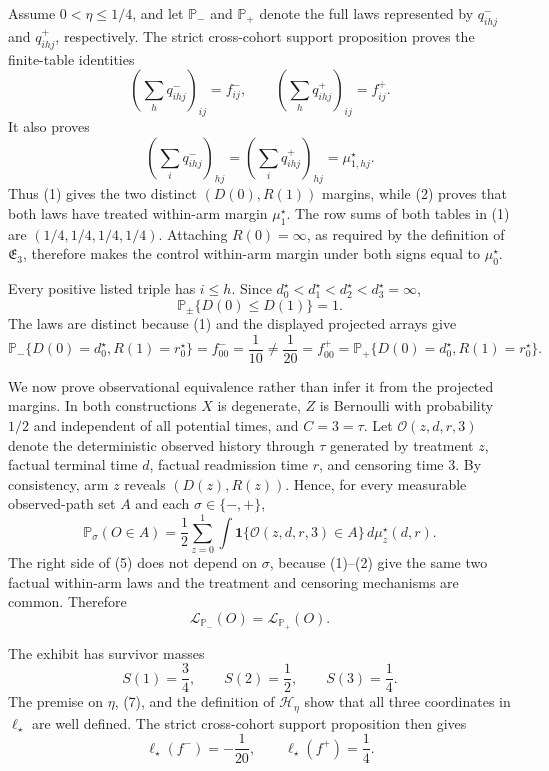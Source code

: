 Assume \(0<\eta\leq1/4\), and let \(\mathbb P_-\) and \(\mathbb P_+\) denote the full laws represented by \(q^-_{ihj}\) and \(q^+_{ihj}\), respectively.  The strict cross-cohort support proposition proves the finite-table identities
\[
 \left(\sum_hq^-_{ihj}\right)_{ij}=f^-_{ij},\qquad
 \left(\sum_hq^+_{ihj}\right)_{ij}=f^+_{ij}. \tag{1}
\]
It also proves
\[
 \left(\sum_iq^-_{ihj}\right)_{hj}
 =\left(\sum_iq^+_{ihj}\right)_{hj}
 =\mu_{1,hj}^\star. \tag{2}
\]
Thus (1) gives the two distinct \((D(0),R(1))\) margins, while (2) proves that both laws have treated within-arm margin \(\mu_1^\star\).  The row sums of both tables in (1) are \((1/4,1/4,1/4,1/4)\).  Attaching \(R(0)=\infty\), as required by the definition of \(\mathfrak E_3\), therefore makes the control within-arm margin under both signs equal to \(\mu_0^\star\).

Every positive listed triple has \(i\leq h\).  Since \(d_0^\star<d_1^\star<d_2^\star<d_3^\star=\infty\),
\[
 \mathbb P_\pm\{D(0)\leq D(1)\}=1. \tag{3}
\]
The laws are distinct because (1) and the displayed projected arrays give
\[
 \mathbb P_-\{D(0)=d_0^\star,R(1)=r_0^\star\}
 =f^-_{00}=\frac1{10}
 \neq\frac1{20}=f^+_{00}
 =\mathbb P_+\{D(0)=d_0^\star,R(1)=r_0^\star\}. \tag{4}
\]

We now prove observational equivalence rather than infer it from the projected margins.  In both constructions \(X\) is degenerate, \(Z\) is Bernoulli with probability \(1/2\) and independent of all potential times, and \(C=3=\tau\).  Let \(\mathcal O(z,d,r,3)\) denote the deterministic observed history through \(\tau\) generated by treatment \(z\), factual terminal time \(d\), factual readmission time \(r\), and censoring time \(3\).  By consistency, arm \(z\) reveals \((D(z),R(z))\).  Hence, for every measurable observed-path set \(A\) and each \(\sigma\in\{-,+\}\),
\[
 \mathbb P_\sigma(O\in A)
 =\frac12\sum_{z=0}^1
 \int\mathbf 1\{\mathcal O(z,d,r,3)\in A\}\,
 d\mu_z^\star(d,r). \tag{5}
\]
The right side of (5) does not depend on \(\sigma\), because (1)--(2) give the same two factual within-arm laws and the treatment and censoring mechanisms are common.  Therefore
\[
 \mathcal L_{\mathbb P_-}(O)=\mathcal L_{\mathbb P_+}(O). \tag{6}
\]

The exhibit has survivor masses
\[
 S(1)=\frac34,\qquad S(2)=\frac12,\qquad S(3)=\frac14. \tag{7}
\]
The premise on \(\eta\), (7), and the definition of \(\mathcal H_\eta\) show that all three coordinates in \(\ell_\star\) are well defined.  The strict cross-cohort support proposition then gives
\[
 \ell_\star(f^-)=-\frac1{20},\qquad
 \ell_\star(f^+)=\frac14. \tag{8}
\]

